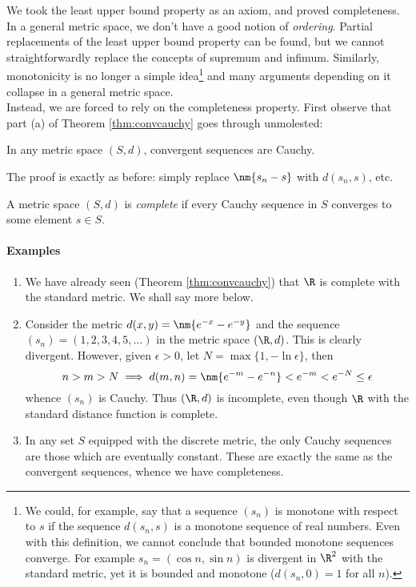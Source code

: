 We took the least upper bound property as an axiom, and proved completeness. In a general metric space, we don't have a good notion of \emph{ordering}. Partial replacements of the least upper bound property can be found, but we cannot straightforwardly replace the concepts of supremum and infimum. Similarly, monotonicity is no longer a simple idea\footnote{We could, for example, say that a sequence $(s_n)$ is monotone with respect to $s$ if the sequence $d(s_n,s)$ is a monotone sequence of real numbers. Even with this definition, we cannot conclude that bounded monotone sequences converge. For example $s_n=(\cos n,\sin n)$ is divergent in $\R^2$ with the standard metric, yet it is bounded and monotone ($d(s_n,0)=1$ for all $n$).} and many arguments depending on it collapse in a general metric space.\\

Instead, we are forced to rely on the completeness property. First observe that part (a) of Theorem \ref{thm:convcauchy} goes through unmolested:

\begin{lemm}
In any metric space $(S,d)$, convergent sequences are Cauchy.
\end{lemm}

The proof is exactly as before: simply replace $\nm{s_n-s}$ with $d(s_n,s)$, etc. 

\begin{defn}
A metric space $(S,d)$ is \emph{complete} if every Cauchy sequence in $S$ converges to some element $s\in S$.
\end{defn}

\paragraph{Examples}

\begin{enumerate}
  \item We have already seen (Theorem \ref{thm:convcauchy}) that $\R$ is complete with the standard metric. We shall say more below.
  \item Consider the metric $d(x,y)=\nm{e^{-x}-e^{-y}}$ and the sequence $(s_n)=(1,2,3,4,5,\ldots)$ in the metric space $(\R,d)$. This is clearly divergent. However, given $\epsilon>0$, let $N=\max\{1,-\ln\epsilon\}$, then
\[n>m>N\implies d(m,n)=\nm{e^{-m}-e^{-n}}<e^{-m}<e^{-N}\le\epsilon\]
whence $(s_n)$ is Cauchy. Thus $(\R,d)$ is incomplete, even though $\R$ with the standard distance function is complete.
	\item In any set $S$ equipped with the discrete metric, the only Cauchy sequences are those which are eventually constant. These are exactly the same as the convergent sequences, whence we have completeness.
\end{enumerate}

